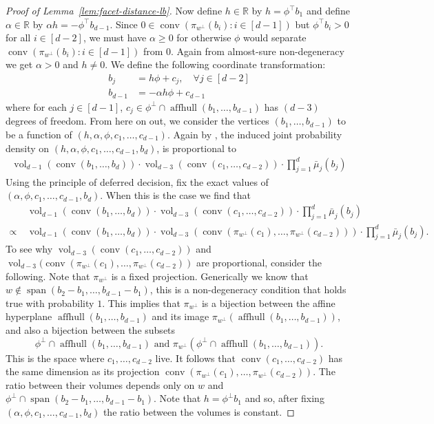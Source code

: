 \documentclass{article}\usepackage[a4paper,margin=20mm]{geometry}
\newcommand{\R}{\mathbb R}
\newcommand{\T}{\top}
\newcommand{\aff}{\operatorname{affhull}}
\newcommand{\conv}{\operatorname{conv}}
\newcommand{\vol}{\operatorname{vol}}
\begin{document}
\begin{proof}[Proof of Lemma~\ref{lem:facet-distance-lb}]
Now define $h \in \R$ by $h = \phi^\T b_1$ and define $\alpha \in \R$
by $\alpha h = - \phi^\T b_{d-1}$.
Since $0 \in \conv(\pi_{w^\perp}(b_i) : i \in [d-1])$ but $\phi^\T b_i > 0$ for all $i \in [d-2]$,
we must have $\alpha \geq 0$ for otherwise $\phi$ would separate $\conv(\pi_{w^\perp}(b_i) : i \in [d-1])$ from $0$.
Again from almost-sure non-degeneracy we get $\alpha > 0$ and $h \neq 0$.
We define the following coordinate transformation:
\begin{align*}
    b_j &= h\phi + c_j, \quad \forall j \in [d-2] \\
    b_{d-1} &= - \alpha h \phi + c_{d-1}
\end{align*}
where for each $j \in [d-1]$, $c_j \in \phi^\perp \cap \aff(b_1, \ldots, b_{d-1})$ has $(d-3)$ degrees of freedom.
From here on out, we consider the vertices $(b_1, \ldots,  b_{d-1})$
to be a function of $(h,\alpha, \phi, c_1,\dots,c_{d-1})$.
Again by ,
the induced joint probability density on $(h,\alpha, \phi, c_1,\dots,c_{d-1}, b_d)$,
is proportional to
\begin{align*}
\vol_{d-1}(\conv(b_1,\dots,b_d)) \cdot
\vol_{d-3}(\conv(c_1, \ldots, c_{d-2})) \cdot
\prod_{j=1}^d \bar{\mu}_j(b_j)
\end{align*}
Using the principle of deferred decision,
fix the exact values of $(\alpha, \phi, c_1,\dots,c_{d-1}, b_d)$.
When this is the case we find that
\begin{align*}
& \vol_{d-1}(\conv(b_1,\dots,b_d)) \cdot
\vol_{d-3}(\conv(c_1, \ldots, c_{d-2})) \cdot
\prod_{j=1}^d \bar{\mu}_j(b_j) \\
\propto ~ & \vol_{d-1}(\conv(b_1,\dots,b_d)) \cdot
\vol_{d-3}(\conv(\pi_{w^\perp}(c_1),\dots,\pi_{w^\perp}(c_{d-2}))) \cdot
\prod_{j=1}^d \bar{\mu}_j(b_j).
\end{align*}
To see why $\vol_{d-3}(\conv(c_{1}, \dots, c_{d-2}))$ and $\vol_{d-3}(\conv(\pi_{w^\perp}(c_{1}),\dots, \pi_{w^\perp}(c_{d-2}))$ are proportional, consider the following.
Note that $\pi_{w^\perp}$ is a fixed projection.
Generically we know that $w \notin \operatorname{span}(b_2-b_1,\dots,b_{d-1}-b_1)$,
this is a non-degeneracy condition that holds true with probability $1$.
This implies that $\pi_{w^\perp}$ is a bijection between the affine hyperplane
$\aff(b_1,\dots,b_{d-1})$ and its image $\pi_{w^\perp}(\aff(b_1,\dots,b_{d-1}))$,
and also a bijection between the subsets
\[
\phi^\perp \cap \aff(b_1,\dots,b_{d-1}) \text{~and~} \pi_{w^\perp}(\phi^\perp \cap \aff(b_1,\dots,b_{d-1})).
\]
This is the space where $c_1,\dots,c_{d-2}$ live. It follows that
$\conv(c_1, \ldots, c_{d-2})$ has the same dimension as
its projection 
$\conv(\pi_{w^\perp}(c_1),\dots,\pi_{w^\perp}(c_{d-2}))$.
The ratio between their volumes depends only on $w$ and
$\phi^\perp \cap \operatorname{span}(b_2-b_1,\dots,b_{d-1}-b_1)$.
Note that $h = \phi^\perp b_1$ and so, after fixing $(\alpha, \phi, c_1,\dots,c_{d-1}, b_d)$
the ratio between the volumes is constant.


\end{proof}
\end{document}
